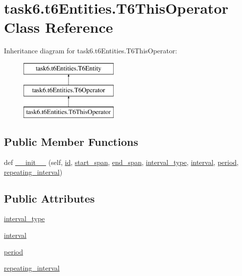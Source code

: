 \hypertarget{classtask6_1_1t6Entities_1_1T6ThisOperator}{}\section{task6.\+t6\+Entities.\+T6\+This\+Operator Class Reference}
\label{classtask6_1_1t6Entities_1_1T6ThisOperator}
Inheritance diagram for task6.\+t6\+Entities.\+T6\+This\+Operator\+:\begin{figure}[H]
\begin{center}
\leavevmode
\includegraphics[height=3.000000cm]{classtask6_1_1t6Entities_1_1T6ThisOperator}
\end{center}
\end{figure}
\subsection*{Public Member Functions}
\begin{DoxyCompactItemize}
\item 
def \hyperlink{classtask6_1_1t6Entities_1_1T6ThisOperator_a3ff7e85bf38c12b6285d9af727c7290f}{\+\_\+\+\_\+init\+\_\+\+\_\+} (self, \hyperlink{classtask6_1_1t6Entities_1_1T6Entity_afeeced8134bb3ebe0cfecc64d0ab46a4}{id}, \hyperlink{classtask6_1_1t6Entities_1_1T6Entity_a52779e9af8864dc98e8b02fc5b9b041a}{start\+\_\+span}, \hyperlink{classtask6_1_1t6Entities_1_1T6Entity_aeb402200b156cd9562c5111dfe777b98}{end\+\_\+span}, \hyperlink{classtask6_1_1t6Entities_1_1T6ThisOperator_a4237e7eb65230f550e70c7979aa76286}{interval\+\_\+type}, \hyperlink{classtask6_1_1t6Entities_1_1T6ThisOperator_adadb6bba14cc5adcdaad1c585907061d}{interval}, \hyperlink{classtask6_1_1t6Entities_1_1T6ThisOperator_ac35cef8f01d47ee15a85b1d284ab5d41}{period}, \hyperlink{classtask6_1_1t6Entities_1_1T6ThisOperator_a1e995a6c80ad81b118c76bbc200969ab}{repeating\+\_\+interval})
\end{DoxyCompactItemize}
\subsection*{Public Attributes}
\begin{DoxyCompactItemize}
\item 
\hyperlink{classtask6_1_1t6Entities_1_1T6ThisOperator_a4237e7eb65230f550e70c7979aa76286}{interval\+\_\+type}
\item 
\hyperlink{classtask6_1_1t6Entities_1_1T6ThisOperator_adadb6bba14cc5adcdaad1c585907061d}{interval}
\item 
\hyperlink{classtask6_1_1t6Entities_1_1T6ThisOperator_ac35cef8f01d47ee15a85b1d284ab5d41}{period}
\item 
\hyperlink{classtask6_1_1t6Entities_1_1T6ThisOperator_a1e995a6c80ad81b118c76bbc200969ab}{repeating\+\_\+interval}
\end{DoxyCompactItemize}


